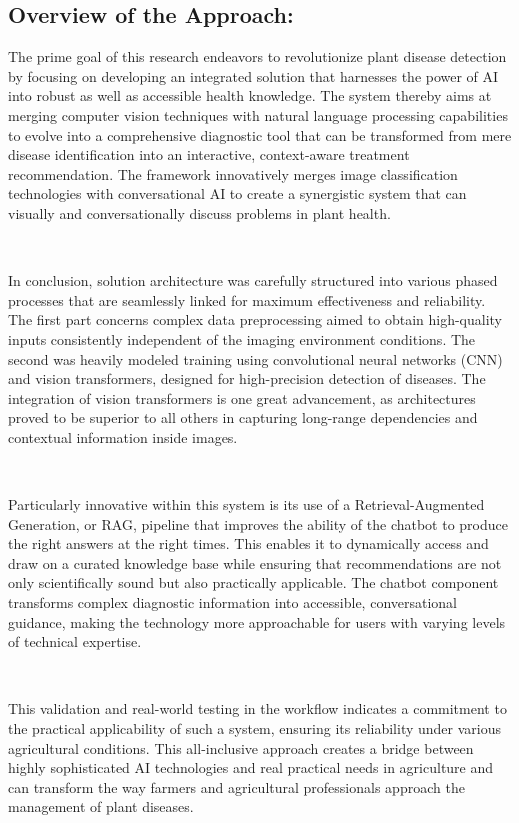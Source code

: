 \subsection{Overview of the Approach:} 
The prime goal of this research endeavors to revolutionize plant disease detection by focusing on developing an integrated solution that harnesses the power of AI into robust as well as accessible health knowledge. The system thereby aims at merging computer vision techniques with natural language processing capabilities to evolve into a comprehensive diagnostic tool that can be transformed from mere disease identification into an interactive, context-aware treatment recommendation. The framework innovatively merges image classification technologies with conversational AI to create a synergistic system that can visually and conversationally discuss problems in plant health.

\

In conclusion, solution architecture was carefully structured into various phased processes that are seamlessly linked for maximum effectiveness and reliability. The first part concerns complex data preprocessing aimed to obtain high-quality inputs consistently independent of the imaging environment conditions. The second was heavily modeled training using convolutional neural networks (CNN) and vision transformers, designed for high-precision detection of diseases. The integration of vision transformers is one great advancement, as architectures proved to be superior to all others in capturing long-range dependencies and contextual information inside images.

\

Particularly innovative within this system is its use of a Retrieval-Augmented Generation, or RAG, pipeline that improves the ability of the chatbot to produce the right answers at the right times. This enables it to dynamically access and draw on a curated knowledge base while ensuring that recommendations are not only scientifically sound but also practically applicable. The chatbot component transforms complex diagnostic information into accessible, conversational guidance, making the technology more approachable for users with varying levels of technical expertise.

\

This validation and real-world testing in the workflow indicates a commitment to the practical applicability of such a system, ensuring its reliability under various agricultural conditions. This all-inclusive approach creates a bridge between highly sophisticated AI technologies and real practical needs in agriculture and can transform the way farmers and agricultural professionals approach the management of plant diseases.


